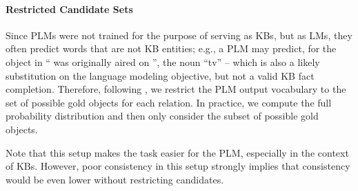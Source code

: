 
\paragraph{Restricted Candidate Sets}
Since PLMs were not trained for the purpose of
serving as KBs, but as LMs, they often predict words
that are not KB entities;
e.g., a PLM may predict, for the object in ``\subj{}
was originally aired on \obj{}'', the noun
``tv'' --  which is also a likely substitution on the language
modeling objective, but not a valid KB fact completion.
Therefore,
following \citep{Xiong2020Pretrained, nora@@},
we
restrict the PLM output vocabulary to the set of possible gold objects for each
relation. In practice, we compute the full probability
distribution and then only consider the subset of possible
gold objects.

Note that this setup makes the task easier for the PLM,
especially in the context of KBs. However, poor
consistency in this setup strongly implies that consistency
would be even lower without restricting candidates.
